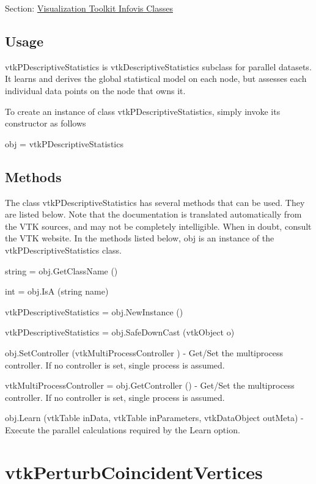 Section\-: \hyperlink{sec_vtkinfovis}{Visualization Toolkit Infovis Classes} \hypertarget{vtkwidgets_vtkxyplotwidget_Usage}{}\subsection{Usage}\label{vtkwidgets_vtkxyplotwidget_Usage}
vtk\-P\-Descriptive\-Statistics is vtk\-Descriptive\-Statistics subclass for parallel datasets. It learns and derives the global statistical model on each node, but assesses each individual data points on the node that owns it.

To create an instance of class vtk\-P\-Descriptive\-Statistics, simply invoke its constructor as follows \begin{DoxyVerb}  obj = vtkPDescriptiveStatistics
\end{DoxyVerb}
 \hypertarget{vtkwidgets_vtkxyplotwidget_Methods}{}\subsection{Methods}\label{vtkwidgets_vtkxyplotwidget_Methods}
The class vtk\-P\-Descriptive\-Statistics has several methods that can be used. They are listed below. Note that the documentation is translated automatically from the V\-T\-K sources, and may not be completely intelligible. When in doubt, consult the V\-T\-K website. In the methods listed below, {\ttfamily obj} is an instance of the vtk\-P\-Descriptive\-Statistics class. 
\begin{DoxyItemize}
\item {\ttfamily string = obj.\-Get\-Class\-Name ()}  
\item {\ttfamily int = obj.\-Is\-A (string name)}  
\item {\ttfamily vtk\-P\-Descriptive\-Statistics = obj.\-New\-Instance ()}  
\item {\ttfamily vtk\-P\-Descriptive\-Statistics = obj.\-Safe\-Down\-Cast (vtk\-Object o)}  
\item {\ttfamily obj.\-Set\-Controller (vtk\-Multi\-Process\-Controller )} -\/ Get/\-Set the multiprocess controller. If no controller is set, single process is assumed.  
\item {\ttfamily vtk\-Multi\-Process\-Controller = obj.\-Get\-Controller ()} -\/ Get/\-Set the multiprocess controller. If no controller is set, single process is assumed.  
\item {\ttfamily obj.\-Learn (vtk\-Table in\-Data, vtk\-Table in\-Parameters, vtk\-Data\-Object out\-Meta)} -\/ Execute the parallel calculations required by the Learn option.  
\end{DoxyItemize}\hypertarget{vtkinfovis_vtkperturbcoincidentvertices}{}\section{vtk\-Perturb\-Coincident\-Vertices}\label{vtkinfovis_vtkperturbcoincidentvertices}
